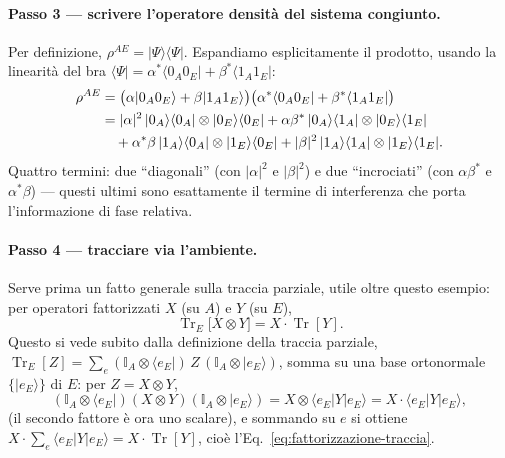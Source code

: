 \documentclass[11pt,a4paper]{article}
\newcommand{\ket}[1]{\lvert #1 \rangle}
\newcommand{\bra}[1]{\langle #1 \rvert}
\newcommand{\Tr}{\operatorname{Tr}}
\begin{document}
\paragraph{Passo 3 --- scrivere l'operatore densità del sistema congiunto.} Per
definizione, $\rho^{AE}=\ket\Psi\bra\Psi$. Espandiamo esplicitamente il prodotto,
usando la linearità del bra $\bra\Psi=\alpha^*\bra{0_A0_E}+\beta^*\bra{1_A1_E}$:
\begin{align}
\rho^{AE} &= \big(\alpha\ket{0_A0_E}+\beta\ket{1_A1_E}\big)
             \big(\alpha^*\bra{0_A0_E}+\beta^*\bra{1_A1_E}\big) \notag\\
&= |\alpha|^2\,\ket{0_A}\bra{0_A}\otimes\ket{0_E}\bra{0_E}
 + \alpha\beta^*\,\ket{0_A}\bra{1_A}\otimes\ket{0_E}\bra{1_E} \notag\\
&\quad + \alpha^*\beta\,\ket{1_A}\bra{0_A}\otimes\ket{1_E}\bra{0_E}
 + |\beta|^2\,\ket{1_A}\bra{1_A}\otimes\ket{1_E}\bra{1_E}.
\label{eq:step4}
\end{align}
Quattro termini: due ``diagonali'' (con $|\alpha|^2$ e $|\beta|^2$) e due
``incrociati'' (con $\alpha\beta^*$ e $\alpha^*\beta$) --- questi ultimi sono
esattamente il termine di interferenza che porta l'informazione di fase relativa.

\paragraph{Passo 4 --- tracciare via l'ambiente.} Serve prima un fatto generale sulla
traccia parziale, utile oltre questo esempio: per operatori fattorizzati $X$ (su $A$)
e $Y$ (su $E$),
\begin{equation}
\Tr_E\big[X\otimes Y\big] = X\cdot\Tr[Y].
\label{eq:fattorizzazione-traccia}
\end{equation}
Questo si vede subito dalla definizione della traccia parziale,
$\Tr_E[Z]=\sum_e(\mathbb I_A\otimes\bra{e_E})\,Z\,(\mathbb I_A\otimes\ket{e_E})$, somma
su una base ortonormale $\{\ket{e_E}\}$ di $E$: per $Z=X\otimes Y$,
\begin{equation}
(\mathbb I_A\otimes\bra{e_E})(X\otimes Y)(\mathbb I_A\otimes\ket{e_E})
= X\otimes\bra{e_E}Y\ket{e_E} = X\cdot\bra{e_E}Y\ket{e_E},
\end{equation}
(il secondo fattore è ora uno scalare), e sommando su $e$ si ottiene
$X\cdot\sum_e\bra{e_E}Y\ket{e_E}=X\cdot\Tr[Y]$, cioè l'Eq.~\eqref{eq:fattorizzazione-traccia}.
\end{document}
